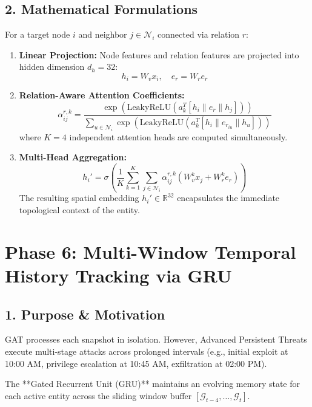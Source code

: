 \documentclass[11pt,a4paper]{report}
\begin{document}
\subsection{2. Mathematical Formulations}
For a target node $i$ and neighbor $j \in \mathcal{N}_i$ connected via relation $r$:
\begin{enumerate}
    \item \textbf{Linear Projection:} Node features and relation features are projected into hidden dimension $d_h = 32$:
    $$h_i = W_v x_i, \quad e_r = W_r e_r$$
    \item \textbf{Relation-Aware Attention Coefficients:}
    $$\alpha_{ij}^{r, k} = \frac{\exp\left( \text{LeakyReLU}\left( a_k^T [h_i \parallel e_r \parallel h_j] \right) \right)}{\sum_{u \in \mathcal{N}_i} \exp\left( \text{LeakyReLU}\left( a_k^T [h_i \parallel e_{r_{iu}} \parallel h_u] \right) \right)}$$
    where $K = 4$ independent attention heads are computed simultaneously.
    \item \textbf{Multi-Head Aggregation:}
    $$h_i' = \sigma\left( \frac{1}{K} \sum_{k=1}^K \sum_{j \in \mathcal{N}_i} \alpha_{ij}^{r, k} (W_v^k x_j + W_r^k e_r) \right)$$
    The resulting spatial embedding $h_i' \in \mathbb{R}^{32}$ encapsulates the immediate topological context of the entity.
\end{enumerate}

\section{Phase 6: Multi-Window Temporal History Tracking via GRU}

\subsection{1. Purpose \& Motivation}
GAT processes each snapshot in isolation. However, Advanced Persistent Threats execute multi-stage attacks across prolonged intervals (e.g., initial exploit at 10:00 AM, privilege escalation at 10:45 AM, exfiltration at 02:00 PM).

The **Gated Recurrent Unit (GRU)** maintains an evolving memory state for each active entity across the sliding window buffer $[\mathcal{G}_{t-4}, \dots, \mathcal{G}_t]$.
\end{document}
